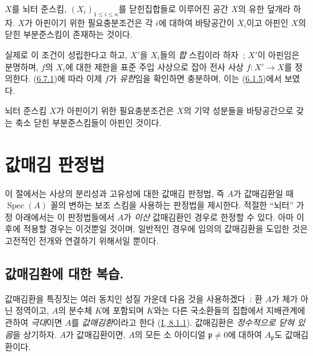 \begin{corollary}[6.7.2]
\label{II.6.7.2-ko}
$X$를 뇌터 준스킴, $(X_i)_{1\leq i\leq n}$를 닫힌집합들로 이루어진
공간 $X$의 유한 덮개라 하자. $X$가 아핀이기 위한 필요충분조건은 각
$i$에 대하여 바탕공간이 $X_i$이고 아핀인 $X$의 닫힌 부분준스킴이
존재하는 것이다.
\end{corollary}

실제로 이 조건이 성립한다고 하고, $X'$을 $X_i$들의 \emph{합} 스킴이라
하자~; $X'$이 아핀임은 분명하며, $f$의 $X_i$에 대한 제한을 표준 주입
사상으로 잡아 전사 사상 $f:X'\to X$를 정의한다.
(\hyperref[II.6.7.1-ko]{6.7.1})에 따라 이제 $f$가 \emph{유한}임을
확인하면 충분하며, 이는 (\hyperref[II.6.1.5-ko]{6.1.5})에서
보였다.

\begin{corollary}[6.7.3]
\label{II.6.7.3-ko}
뇌터 준스킴 $X$가 아핀이기 위한 필요충분조건은 $X$의 기약 성분들을
바탕공간으로 갖는 축소 닫힌 부분준스킴들이 아핀인 것이다.
\end{corollary}

\section{값매김 판정법}
\label{section:II.7-ko}

이 절에서는 사상의 분리성과 고유성에 대한 값매김 판정법, 즉 $A$가
값매김환일 때 $\operatorname{Spec}(A)$ 꼴의 변하는 보조 스킴을 사용하는
판정법을 제시한다. 적절한 ``뇌터'' 가정 아래에서는 이 판정법들에서
$A$가 \emph{이산} 값매김환인 경우로 한정할 수 있다. 아마 이후에
적용할 경우는 이것뿐일 것이며, 일반적인 경우에 임의의 값매김환을
도입한 것은 고전적인 전개와 연결하기 위해서일 뿐이다.

\subsection{값매김환에 대한 복습.}
\label{subsection:II.7.1-ko}

\begin{env}[7.1.1]
\label{II.7.1.1-ko}
값매김환을 특징짓는 여러 동치인 성질 가운데 다음 것을 사용하겠다~:
환 $A$가 체가 아닌 정역이고, $A$의 분수체 $K$에 포함되며 $K$와는
다른 국소환들의 집합에서 지배관계에 관하여 \emph{극대}이면 $A$를
\emph{값매김환}이라고 한다
(\hyperref[I.8.1.1-ko]{I, 8.1.1}). 값매김환은 \emph{정수적으로
닫혀 있음}을 상기하자. $A$가 값매김환이면, $A$의 모든 소 아이디얼
$\mathfrak{p}\neq0$에 대하여 $A_{\mathfrak{p}}$도 값매김환이다.
\end{env}

